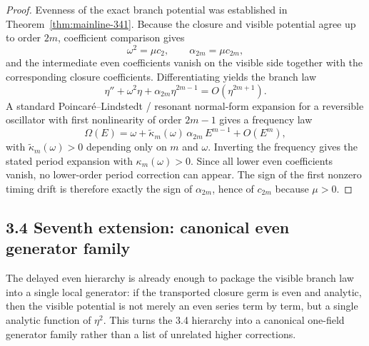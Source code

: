 \documentclass[12pt,a4paper]{article}
\begin{document}
\begin{proof}
Evenness of the exact branch potential was established in Theorem~\ref{thm:mainline-341}. Because the closure and visible potential agree up to order $2m$, coefficient comparison gives
\[
 \omega^2=\mu c_2,
 \qquad
 \alpha_{2m}=\mu c_{2m},
\]
and the intermediate even coefficients vanish on the visible side together with the corresponding closure coefficients. Differentiating yields the branch law
\[
 \eta''+\omega^2\eta+\alpha_{2m}\eta^{2m-1}=O(\eta^{2m+1}).
\]
A standard Poincar\'e--Lindstedt / resonant normal-form expansion for a reversible oscillator with first nonlinearity of order $2m-1$ gives a frequency law
\[
 \Omega(E)=\omega+\widetilde\kappa_m(\omega)\,\alpha_{2m}\,E^{m-1}+O(E^m),
\]
with $\widetilde\kappa_m(\omega)>0$ depending only on $m$ and $\omega$. Inverting the frequency gives the stated period expansion with $\kappa_m(\omega)>0$. Since all lower even coefficients vanish, no lower-order period correction can appear. The sign of the first nonzero timing drift is therefore exactly the sign of $\alpha_{2m}$, hence of $c_{2m}$ because $\mu>0$.
\end{proof}

\subsection*{3.4 Seventh extension: canonical even generator family}
The delayed even hierarchy is already enough to package the visible branch law into a single local generator: if the transported closure germ is even and analytic, then the visible potential is not merely an even series term by term, but a single analytic function of $\eta^2$. This turns the 3.4 hierarchy into a canonical one-field generator family rather than a list of unrelated higher corrections.
\end{document}

